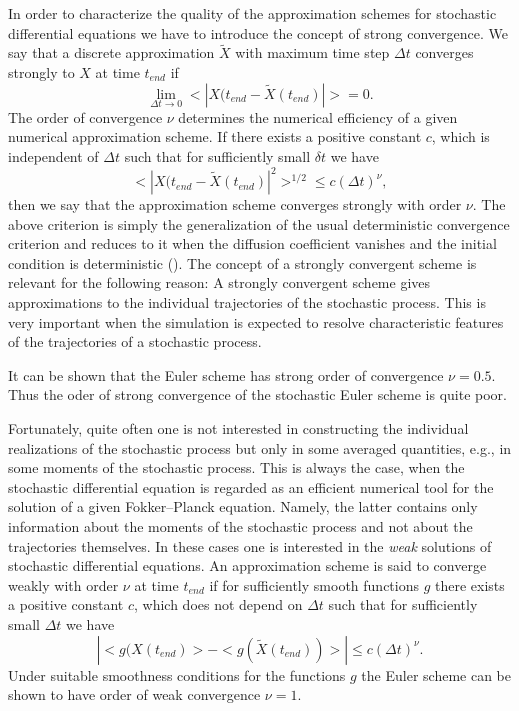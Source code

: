 In order to characterize the quality of the approximation schemes 
for stochastic differential equations we have to introduce the 
concept of strong convergence. We say that a discrete 
approximation $\tilde{X}$ with maximum time step $\Delta t$
converges strongly to $X$ at time $t_{end}$ if
\begin{equation*}
\lim_{\Delta t \rightarrow 0} <|X(t_{end} - \tilde{X}(t_{end})|> 
=0.
\end{equation*}
The order of convergence $\nu$ determines the numerical efficiency
of a given numerical approximation scheme. If there exists a 
positive constant $c$, which is independent of $\Delta t$ such 
that for sufficiently small $\delta t$ we have
\begin{equation*}
<|X(t_{end} - \tilde{X}(t_{end})|^2>^{1/2} \le c (\Delta t)^{\nu},
\end{equation*}
then we say that the approximation scheme converges strongly with
order $\nu$. 
The above criterion is simply the generalization of the usual 
deterministic convergence criterion and reduces to it when the 
diffusion coefficient vanishes and the initial condition is
deterministic (\cite{KLOEDEN}). 
The concept of a strongly  convergent scheme is relevant for the
following reason: A strongly convergent scheme gives 
approximations to the individual trajectories of the 
stochastic process. This is very important when the simulation is 
expected to resolve characteristic features of the trajectories of 
a stochastic process.

It can be shown that the Euler scheme  has strong 
order of convergence $\nu = 0.5$. Thus the oder of strong 
convergence of the stochastic Euler scheme is quite poor.

Fortunately, quite often one is not interested in constructing the 
individual realizations of the stochastic process but only in some 
averaged quantities, e.g., in some moments of the stochastic 
process. This is always the case, when the stochastic differential 
equation is regarded as an efficient numerical tool for the
solution of a given Fokker--Planck equation. Namely, the latter 
contains only information about the moments of the stochastic 
process and not about the trajectories themselves. In these cases
one is interested in the {\em weak} solutions of stochastic 
differential equations. An approximation scheme is said to 
converge weakly with order $\nu$ at time $t_{end}$ if for 
sufficiently smooth functions $g$ there exists a positive constant 
$c$, which does not depend on $\Delta t$ such that for 
sufficiently small $\Delta t$ we have
\begin{equation*}
|<g(X(t_{end})> - <g(\tilde{X}(t_{end}))>| \le c (\Delta t)^{\nu}.
\end{equation*}
Under suitable smoothness conditions for the functions $g$ the 
Euler scheme can be shown to have order of weak convergence 
$\nu=1$.

